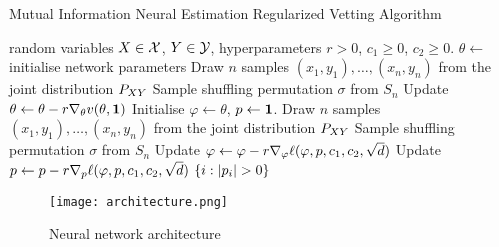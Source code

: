 \begin{algorithm}
	\caption{Mutual Information Neural Estimation Regularized Vetting Algorithm}
	\label{algo.minerva}
	\begin{algorithmic}[1]
		\REQUIRE
		random variables
		$X\in \mathcal{X}$,
		$Y\in \mathcal{Y}$,
		hyperparameters
		$r>0$, $c_1\geq 0$, $c_2\geq 0$.
		\STATE $\theta \leftarrow$ initialise network parameters
		\REPEAT
		\STATE Draw $n$ samples $(x_1, y_1), \dots, (x_n, y_n)$ from the joint distribution ${{P}}_{XY}$
		\STATE Sample shuffling permutation $\sigma$ from $S_n$
		\STATE Update $\theta \leftarrow \theta - r\nabla_{\theta}{v}(\theta, \mathbf{1})$%
		\STATE Initialise $\varphi \leftarrow \theta$, ${p} \leftarrow \mathbf{1}$.
		\REPEAT
		\STATE Draw $n$ samples $(x_1, y_1), \dots, (x_n, y_n)$ from the joint distribution ${{P}}_{XY}$
		\STATE Sample shuffling permutation $\sigma$ from $S_n$
		\STATE Update $\varphi \leftarrow \varphi - r \nabla_{\varphi}{\ell}(\varphi, {p}, c_1, c_2, \sqrt{d})$
		\STATE Update ${p} \leftarrow {p} - r \nabla_{{p}}{\ell}(\varphi, {p}, c_1, c_2, \sqrt{d})$
		\RETURN $\left\lbrace i: \left\lvert {{p}_i} \right\rvert > 0\right\rbrace$
	\end{algorithmic}
\end{algorithm}

\begin{figure}
	\caption{Neural network architecture}
	\label{fig.networkarchitecture}
	\texttt{[image: architecture.png]}
\end{figure}






